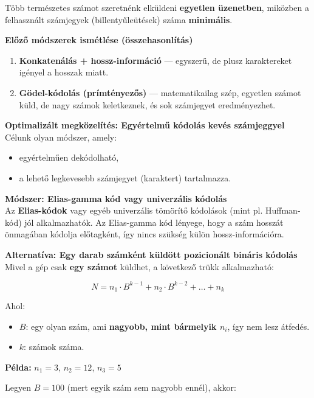 \begin{solution}
Több természetes számot szeretnénk elküldeni \textbf{egyetlen üzenetben},
miközben a felhasznált számjegyek (billentyűleütések) száma \textbf{minimális}.


\textbf{Előző módszerek ismétlése (összehasonlítás)}\\
\begin{enumerate}
\item \textbf{Konkatenálás + hossz-információ} --- egyszerű, de plusz karaktereket
igényel a hosszak miatt. 
\item \textbf{Gödel-kódolás (prímtényezős)} --- matematikailag szép, egyetlen
számot küld, de nagy számok keletkeznek, és sok számjegyet eredményezhet. 
\end{enumerate}

\textbf{Optimalizált megközelítés: Egyértelmű kódolás kevés számjeggyel}\\

Célunk olyan módszer, amely: 
\begin{itemize}
\item egyértelműen dekódolható, 
\item a lehető legkevesebb számjegyet (karaktert) tartalmazza. 
\end{itemize}

\textbf{Módszer: Elias-gamma kód vagy univerzális kódolás}\\

Az \textbf{Elias-kódok} vagy egyéb univerzális tömörítő kódolások
(mint pl. Huffman-kód) jól alkalmazhatók. Az Elias-gamma kód lényege,
hogy a szám hosszát önmagában kódolja előtagként, így nincs szükség
külön hossz-információra.

\textbf{Alternatíva: Egy darab számként küldött pozicionált bináris kódolás}\\

Mivel a gép csak \textbf{egy számot} küldhet, a következő trükk alkalmazható:

\[
N=n_{1}\cdot B^{k-1}+n_{2}\cdot B^{k-2}+\dots+n_{k}
\]

Ahol: 
\begin{itemize}
\item $B$: egy olyan szám, ami \textbf{nagyobb, mint bármelyik $n_{i}$},
így nem lesz átfedés. 
\item $k$: számok száma. 
\end{itemize}
\textbf{Példa:} $n_{1}=3$, $n_{2}=12$, $n_{3}=5$

Legyen $B=100$ (mert egyik szám sem nagyobb ennél), akkor:


\end{solution}
